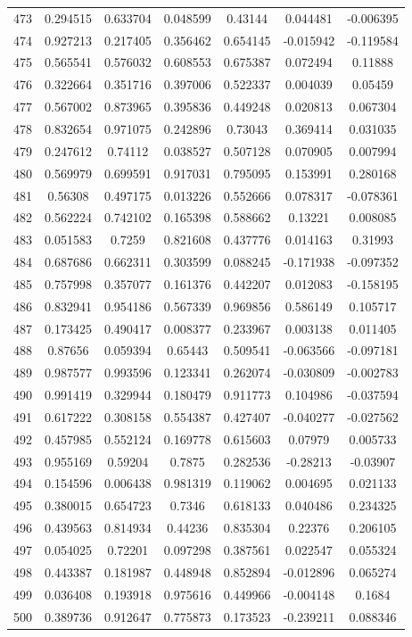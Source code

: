 \begin{table}
\begin{tabular}{c|c|c|c|c|c|c}
473 & 0.294515 & 0.633704 & 0.048599 & 0.43144 & 0.044481 & -0.006395\\
474 & 0.927213 & 0.217405 & 0.356462 & 0.654145 & -0.015942 & -0.119584\\
475 & 0.565541 & 0.576032 & 0.608553 & 0.675387 & 0.072494 & 0.11888\\
476 & 0.322664 & 0.351716 & 0.397006 & 0.522337 & 0.004039 & 0.05459\\
477 & 0.567002 & 0.873965 & 0.395836 & 0.449248 & 0.020813 & 0.067304\\
478 & 0.832654 & 0.971075 & 0.242896 & 0.73043 & 0.369414 & 0.031035\\
479 & 0.247612 & 0.74112 & 0.038527 & 0.507128 & 0.070905 & 0.007994\\
480 & 0.569979 & 0.699591 & 0.917031 & 0.795095 & 0.153991 & 0.280168\\
481 & 0.56308 & 0.497175 & 0.013226 & 0.552666 & 0.078317 & -0.078361\\
482 & 0.562224 & 0.742102 & 0.165398 & 0.588662 & 0.13221 & 0.008085\\
483 & 0.051583 & 0.7259 & 0.821608 & 0.437776 & 0.014163 & 0.31993\\
484 & 0.687686 & 0.662311 & 0.303599 & 0.088245 & -0.171938 & -0.097352\\
485 & 0.757998 & 0.357077 & 0.161376 & 0.442207 & 0.012083 & -0.158195\\
486 & 0.832941 & 0.954186 & 0.567339 & 0.969856 & 0.586149 & 0.105717\\
487 & 0.173425 & 0.490417 & 0.008377 & 0.233967 & 0.003138 & 0.011405\\
488 & 0.87656 & 0.059394 & 0.65443 & 0.509541 & -0.063566 & -0.097181\\
489 & 0.987577 & 0.993596 & 0.123341 & 0.262074 & -0.030809 & -0.002783\\
490 & 0.991419 & 0.329944 & 0.180479 & 0.911773 & 0.104986 & -0.037594\\
491 & 0.617222 & 0.308158 & 0.554387 & 0.427407 & -0.040277 & -0.027562\\
492 & 0.457985 & 0.552124 & 0.169778 & 0.615603 & 0.07979 & 0.005733\\
493 & 0.955169 & 0.59204 & 0.7875 & 0.282536 & -0.28213 & -0.03907\\
494 & 0.154596 & 0.006438 & 0.981319 & 0.119062 & 0.004695 & 0.021133\\
495 & 0.380015 & 0.654723 & 0.7346 & 0.618133 & 0.040486 & 0.234325\\
496 & 0.439563 & 0.814934 & 0.44236 & 0.835304 & 0.22376 & 0.206105\\
497 & 0.054025 & 0.72201 & 0.097298 & 0.387561 & 0.022547 & 0.055324\\
498 & 0.443387 & 0.181987 & 0.448948 & 0.852894 & -0.012896 & 0.065274\\
499 & 0.036408 & 0.193918 & 0.975616 & 0.449966 & -0.004148 & 0.1684\\
500 & 0.389736 & 0.912647 & 0.775873 & 0.173523 & -0.239211 & 0.088346\\
\end{tabular}
\end{table}
